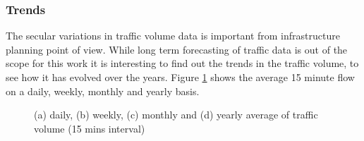 \subsubsection{Trends}
The secular variations in traffic volume data is important from infrastructure planning point of
view. While long term forecasting of traffic data is out of the scope for this work it is interesting
to find out the trends in the traffic volume, to see how it has evolved over the years.
Figure \ref{fig:AverageTrafficVolume} shows the average 15 minute flow on a daily, weekly,
monthly and yearly basis.


\begin{figure}[h]
    \centering
    \qquad

    \qquad

    \caption[Average Traffic Volume]{(a) daily, (b) weekly, (c) monthly and (d) yearly average of
    traffic volume (15 mins interval)}
   \label{fig:AverageTrafficVolume}
\end{figure}


